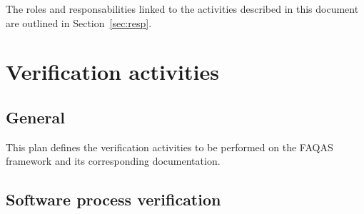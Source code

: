 The roles and responsabilities linked to the activities described in this document are outlined in Section~\ref{sec:resp}.

%
%
%


\section{Verification activities}

\subsection{General}

This plan defines the verification activities to be performed on the FAQAS framework and its corresponding documentation.

\subsection{Software process verification}

